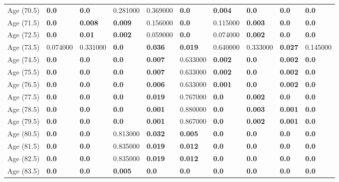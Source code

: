 \begin{tabular}{llllllllll}
Age (70.5) & \textbf{0.0} & \textbf{0.0} & 0.281000 & 0.369000 & \textbf{0.0} & \textbf{0.004} & \textbf{0.0} & \textbf{0.0} & \textbf{0.0} \\
Age (71.5) & \textbf{0.0} & \textbf{0.008} & \textbf{0.009} & 0.156000 & \textbf{0.0} & 0.115000 & \textbf{0.003} & \textbf{0.0} & \textbf{0.0} \\
Age (72.5) & \textbf{0.0} & \textbf{0.01} & \textbf{0.002} & 0.059000 & \textbf{0.0} & 0.074000 & \textbf{0.002} & \textbf{0.0} & \textbf{0.0} \\
Age (73.5) & 0.074000 & 0.331000 & \textbf{0.0} & \textbf{0.036} & \textbf{0.019} & 0.640000 & 0.333000 & \textbf{0.027} & 0.145000 \\
Age (74.5) & \textbf{0.0} & \textbf{0.0} & \textbf{0.0} & \textbf{0.007} & 0.633000 & \textbf{0.002} & \textbf{0.0} & \textbf{0.002} & \textbf{0.0} \\
Age (75.5) & \textbf{0.0} & \textbf{0.0} & \textbf{0.0} & \textbf{0.007} & 0.633000 & \textbf{0.002} & \textbf{0.0} & \textbf{0.002} & \textbf{0.0} \\
Age (76.5) & \textbf{0.0} & \textbf{0.0} & \textbf{0.0} & \textbf{0.006} & 0.633000 & \textbf{0.001} & \textbf{0.0} & \textbf{0.002} & \textbf{0.0} \\
Age (77.5) & \textbf{0.0} & \textbf{0.0} & \textbf{0.0} & \textbf{0.019} & 0.767000 & \textbf{0.0} & \textbf{0.002} & \textbf{0.0} & \textbf{0.0} \\
Age (78.5) & \textbf{0.0} & \textbf{0.0} & \textbf{0.0} & \textbf{0.001} & 0.880000 & \textbf{0.0} & \textbf{0.003} & \textbf{0.001} & \textbf{0.0} \\
Age (79.5) & \textbf{0.0} & \textbf{0.0} & \textbf{0.0} & \textbf{0.001} & 0.867000 & \textbf{0.0} & \textbf{0.002} & \textbf{0.001} & \textbf{0.0} \\
Age (80.5) & \textbf{0.0} & \textbf{0.0} & 0.813000 & \textbf{0.032} & \textbf{0.005} & \textbf{0.0} & \textbf{0.0} & \textbf{0.0} & \textbf{0.0} \\
Age (81.5) & \textbf{0.0} & \textbf{0.0} & 0.835000 & \textbf{0.019} & \textbf{0.012} & \textbf{0.0} & \textbf{0.0} & \textbf{0.0} & \textbf{0.0} \\
Age (82.5) & \textbf{0.0} & \textbf{0.0} & 0.835000 & \textbf{0.019} & \textbf{0.012} & \textbf{0.0} & \textbf{0.0} & \textbf{0.0} & \textbf{0.0} \\
Age (83.5) & \textbf{0.0} & \textbf{0.0} & \textbf{0.005} & \textbf{0.0} & \textbf{0.0} & \textbf{0.0} & \textbf{0.0} & \textbf{0.0} & \textbf{0.0} \\

\end{tabular}
